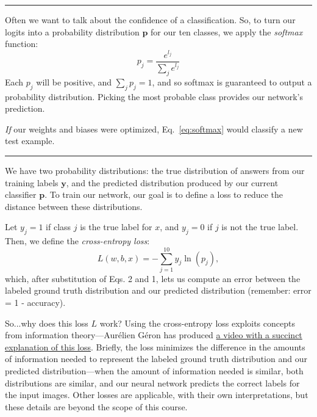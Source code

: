 \documentclass{csci1430}
\begin{document}
\hspace{\fill}\rule{0.5\linewidth}{.5pt}\hspace{\fill}

Often we want to talk about the confidence of a classification. So, to turn our logits into a probability distribution $\mathbf{p}$ for our ten classes, we apply the \emph{softmax} function:
\begin{equation}
    p_j = \frac{e^{l_j}}{\sum_je^{l_j}}
    \label{eq:softmax}
\end{equation}
Each $p_j$ will be positive, and $\sum_jp_j = 1$, and so softmax is guaranteed to output a probability distribution. Picking the most probable class provides our network's prediction.

\emph{If} our weights and biases were optimized, Eq.~\ref{eq:softmax} would classify a new test example.

\hspace{\fill}\rule{0.5\linewidth}{.5pt}\hspace{\fill}

We have two probability distributions: the true distribution of answers from our training labels $\mathbf{y}$, and the predicted distribution produced by our current classifier $\mathbf{p}$. To train our network, our goal is to define a loss to reduce the distance between these distributions.

Let $y_j=1$ if class $j$ is the true label for $x$, and $y_j = 0$ if $j$ is not the true label. Then, we define the \emph{cross-entropy loss}:
\begin{equation}
    L(w,b,x) = - \sum_{j=1}^{10}y_j\ln(p_j),
\end{equation}
which, after substitution of Eqs. 2 and 1, lets us compute an error between the labeled ground truth distribution and our predicted distribution (remember: error = 1 - accuracy).

So...why does this loss $L$ work? Using the cross-entropy loss exploits concepts from information theory---Aur\'{e}lien G\'{e}ron has produced \href{https://www.youtube.com/watch?v=ErfnhcEV1O8}{a video with a succinct explanation of this loss}. Briefly, the loss minimizes the difference in the amounts of information needed to represent the labeled ground truth distribution and our predicted distribution---when the amount of information needed is similar, both distributions are similar, and our neural network predicts the correct labels for the input images. Other losses are applicable, with their own interpretations, but these details are beyond the scope of this course.
\end{document}
